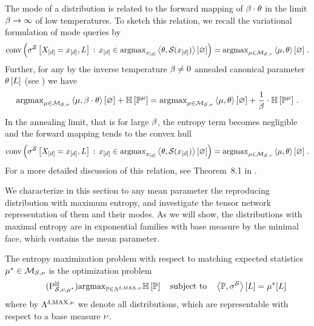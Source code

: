 
The mode of a distribution is related to the forward mapping of $\beta\cdot\theta$ in the limit $\beta\rightarrow\infty$ of low temperatures.
To sketch this relation, we recall the variational formulation of mode queries by
\begin{align*}
    \mathrm{conv}\left(\sigma^{\mathcal{S}}\left[X_{[d]}=x_{[d]},L\right] \,:\, x_{[d]}\in\mathrm{argmax}_{x_{[d]}}\left\langle \theta,\mathcal{S}(x_{[d]})\right\rangle \left[ \varnothing \right]\right)
    = \mathrm{argmax}_{\mu\in\mathcal{M}_{\mathcal{S},\nu}} \left\langle \mu,\theta\right\rangle \left[ \varnothing \right]  \, .
\end{align*}
Further, for any by the inverse temperature $\beta\neq0$ annealed canonical parameter $\theta\left[L\right]$ (see ) we have
\begin{align*}
    \mathrm{argmax}_{\mu\in\mathcal{M}_{\mathcal{S},\nu}}  \left\langle \mu,\beta\cdot\theta\right\rangle \left[ \varnothing \right]+ \mathbb{H}\left[\mathbb{P}^{\mu}\right]
    = \mathrm{argmax}_{\mu\in\mathcal{M}_{\mathcal{S},\nu}}  \left\langle \mu,\theta\right\rangle \left[ \varnothing \right] + \frac{1}{\beta} \cdot \mathbb{H}\left[\mathbb{P}^{\mu}\right] \, .
\end{align*}
In the annealing limit, that is for large $\beta$, the entropy term becomes negligible and the forward mapping tends to the convex hull
\begin{align*}
    \mathrm{conv}\left(\sigma^{\mathcal{S}}\left[X_{[d]}=x_{[d]},L\right] \,:\, x_{[d]}\in\mathrm{argmax}_{x_{[d]}}\left\langle \theta,\mathcal{S}(x_{[d]})\right\rangle \left[ \varnothing \right]\right)
    = \mathrm{argmax}_{\mu\in\mathcal{M}_{\mathcal{S},\nu}} \left\langle \mu,\theta\right\rangle \left[ \varnothing \right]  \, .
\end{align*}
For a more detailed discussion of this relation, see Theorem~8.1 in \cite{wainwright_graphical_2008}.



We characterize in this section to any mean parameter the reproducing distribution with maximum entropy, and investigate the tensor network representation of them and their modes.
As we will show, the distributions with maximal entropy are in exponential families with base measure by the minimal face, which contains the mean parameter.

\label{sec:maxEntProblem}

The entropy maximization problem with respect to matching expected statistics $\mu^*\in\mathcal{M}_{\mathcal{S},\nu}$ is the optimization problem
\begin{align}
    \label{prob:maxEntropy}\tag{$\probtagtypeinst{\entropysymbol}{\sstat,\basemeasure,\genmean}$}%
    \argmax_{\probtensor\in\bmrealprobof{\basemeasure}} \sentropyof{\probtensor} \stspace
    \contractionof{\probtensor,\sencsstat}{\selvariable} = \genmeanat{\selvariable}
\end{align}
where by $\Lambda^{\delta,\mathrm{MAX},\nu}$ we denote all distributions, which are representable with respect to a base measure $\nu$.

